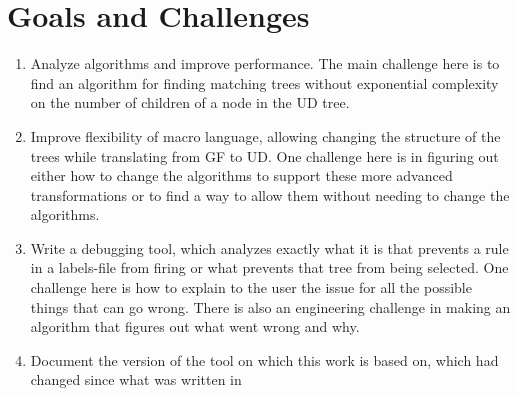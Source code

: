 

\section{Goals and Challenges}





\begin{enumerate}
    \item 
Analyze algorithms and improve performance. The main challenge here is to find an algorithm for finding matching trees without exponential complexity on the number of children of a node in the UD tree.

\item
Improve flexibility of macro language, allowing changing the structure of the trees while translating from GF to UD. One challenge here is in figuring out either how to change the algorithms to support these more advanced transformations or to find a way to allow them without needing to change the algorithms.
\item
 Write a debugging tool, which analyzes exactly what it is that prevents a rule in a labels-file from firing or what prevents that tree from being selected.
One challenge here is how to explain to the user the issue for all the possible things that can go wrong.
There is also an engineering challenge in making an algorithm that figures out what went wrong and why.

\item
 Document the version of the tool on which this work is based on, which had changed since what was written in \cite{kolachina-ranta-2017}
\end{enumerate}


